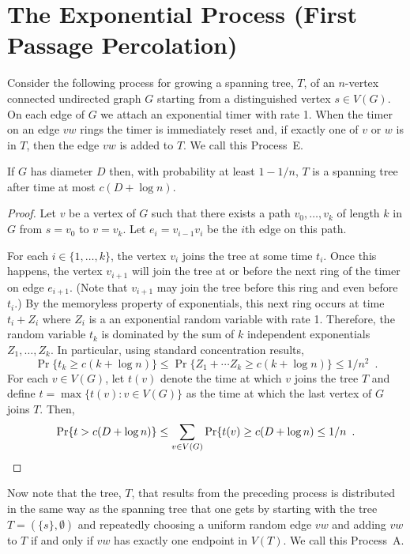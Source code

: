 \documentclass{patmorin}
\begin{document}
\section{The Exponential Process (First Passage Percolation)}

Consider the following process for growing a spanning tree, $T$, of an
$n$-vertex connected undirected graph $G$ starting from a distinguished
vertex $s\in V(G)$.  On each edge of $G$ we attach an exponential timer
with rate 1. When the timer on an edge $vw$ rings the timer is immediately
reset and, if exactly one of $v$ or $w$ is in $T$, then the edge $vw$
is added to $T$.  We call this Process~E.

\begin{lem}
  If $G$ has diameter $D$ then, with probability at least $1-1/n$, $T$
  is a spanning tree after time at most $c(D+\log n)$.
\end{lem}


\begin{proof}
  Let $v$ be a vertex of $G$ such that there exists a path
  $v_0,\ldots,v_k$ of length $k$ in $G$ from $s=v_0$ to $v=v_k$.
  Let $e_i=v_{i-1}v_i$ be the $i$th edge on this path.

  For each $i\in\{1,\ldots,k\}$, the vertex $v_i$ joins the tree at some
  time $t_i$.  Once this happens, the vertex $v_{i+1}$ will join the tree
  at or before the next ring of the timer on edge $e_{i+1}$.  (Note that
  $v_{i+1}$ may join the tree before this ring and even before $t_i$.)
  By the memoryless property of exponentials, this next ring occurs at
  time $t_i+Z_i$ where $Z_i$ is a an exponential random variable with
  rate 1.  Therefore, the random variable $t_k$ is dominated by the sum
  of $k$ independent exponentials $Z_1,\ldots,Z_k$.
  In particular, using standard concentration results,
  \[
      \Pr\{t_k\ge c(k+\log n)\} \le \Pr\{Z_1+\cdots Z_k\ge c(k+\log n)\} \le 1/n^2 \enspace .
  \]
  For each $v\in V(G)$, let $t(v)$ denote the time at which $v$ joins
  the tree $T$ and define $t=\max\{t(v):v\in V(G)\}$
  as the time at which the last vertex of $G$ joins 
  $T$.  Then,
  \[
      \Pr\{t> c(D+\log n)\} \le \sum_{v\in V(G)}\Pr\{t(v) \ge c(D+\log n)     
       \le 1/n \enspace . \qedhere
  \]
\end{proof}

Now note that the tree, $T$, that results from the preceding process
is distributed in the same way as the spanning tree that one gets by
starting with the tree $T=(\{s\},\emptyset)$ and repeatedly choosing
a uniform random edge $vw$ and adding $vw$ to $T$ if and only if $vw$
has exactly one endpoint in $V(T)$.  We call this Process~A.
\end{document}
